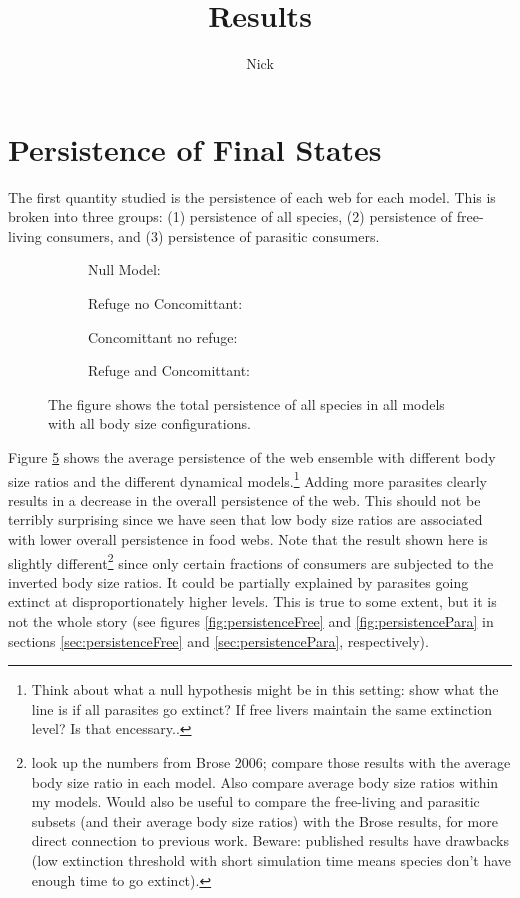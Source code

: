 \documentclass[11pt]{amsart}
\title{Results}
\author{Nick}
\begin{document}
\section{Persistence of Final States}
The first quantity studied is the persistence of each web for each model.  This is broken into three groups: (1) persistence of all species, (2) persistence of free-living consumers, and (3) persistence of parasitic consumers.
\begin{figure}[h]
\begin{subfigure}[t]{.45\textwidth}
\caption{Null Model:\label{fig:persistenceAlla}}
\end{subfigure}
\begin{subfigure}[t]{.45\textwidth}
\caption{Refuge no Concomittant:\label{fig:persistenceAllb}}
\end{subfigure} 
\begin{subfigure}[ct]{.45\textwidth}
\caption{Concomittant no refuge:\label{fig:persistenceAllc}}
\end{subfigure}
\begin{subfigure}[ct]{.45\textwidth}
\caption{Refuge and Concomittant:\label{fig:persistenceAlld}}
\end{subfigure}
\caption{The figure shows the total persistence of all species in all models with all body size configurations.}
\label{fig:persistenceAll}
\end{figure}

Figure \ref{fig:persistenceAll} shows the average persistence of the web ensemble with different body size ratios and the different dynamical models.\footnote{Think about what a null hypothesis might be in this setting: show what the line is if all parasites go extinct?  If free livers maintain the same extinction level?  Is that encessary..}  Adding more parasites clearly results in a decrease in the overall persistence of the web.  This should not be terribly surprising since we have seen that low body size ratios are associated with lower overall persistence in food webs.  Note that the result shown here is slightly different\footnote{look up the numbers from Brose 2006; compare those results with the average body size ratio in each model.  Also compare average body size ratios within my models.  Would also be useful to compare the free-living and parasitic subsets (and their average body size ratios) with the Brose results, for more direct connection to previous work.  Beware: published results have drawbacks (low extinction threshold with short simulation time means species don't have enough time to go extinct).} since only certain fractions of consumers are subjected to the inverted body size ratios. It could be partially explained by parasites going extinct at disproportionately higher levels.  This is true to some extent, but it is not the whole story (see figures \ref{fig:persistenceFree} and \ref{fig:persistencePara} in sections \ref{sec:persistenceFree} and \ref{sec:persistencePara}, respectively).
\end{document}
